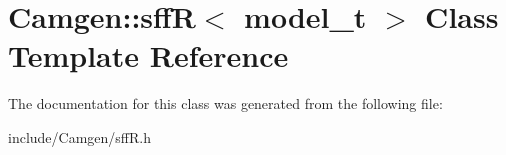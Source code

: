 \hypertarget{a00495}{\section{Camgen\-:\-:sff\-R$<$ model\-\_\-t $>$ Class Template Reference}
\label{a00495}
}


The documentation for this class was generated from the following file\-:\begin{DoxyCompactItemize}
\item 
include/\-Camgen/sff\-R.\-h\end{DoxyCompactItemize}
